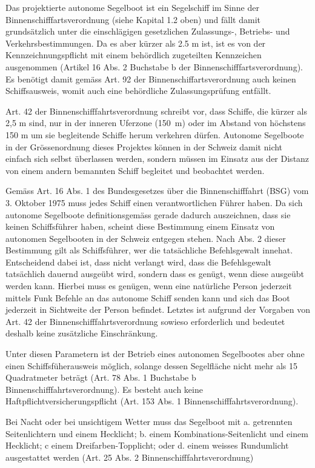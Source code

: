 Das projektierte autonome Segelboot ist ein Segelschiff im Sinne der Binnenschifffartsverordnung (siehe Kapital 1.2 oben) und fällt damit grundsätzlich unter die einschlägigen gesetzlichen Zulassungs-, Betriebs- und Verkehrsbestimmungen. Da es aber kürzer als 2.5 m ist, ist es von der Kennzeichnungspflicht mit einem behördlich zugeteilten Kennzeichen ausgenommen (Artikel 16 Abs. 2 Buchstabe b der Binnenschifffartsverordnung). Es benötigt damit gemäss Art. 92 der Binnenschiffartsverordnung auch keinen Schiffsausweis, womit auch eine behördliche Zulassungsprüfung entfällt.

Art. 42 der Binnenschifffahrtsverordnung schreibt vor, dass Schiffe, die kürzer als 2,5 m sind, nur in der inneren Uferzone (150 m) oder im Abstand von höchstens 150 m um sie begleitende Schiffe herum verkehren dürfen. Autonome Segelboote in der Grössenordnung dieses Projektes können in der Schweiz damit nicht einfach sich selbst überlassen werden, sondern müssen im Einsatz aus der Distanz von einem andern bemannten Schiff begleitet und beobachtet werden.  

Gemäss Art. 16 Abs. 1 des Bundesgesetzes über die Binnenschifffahrt (BSG) vom 3. Oktober 1975 muss jedes Schiff einen verantwortlichen Führer haben. Da sich autonome Segelboote definitionsgemäss gerade dadurch auszeichnen, dass sie keinen Schiffsführer haben, scheint diese Bestimmung einem Einsatz von autonomen Segelbooten in der Schweiz entgegen stehen. Nach Abs. 2 dieser Bestimmung gilt als Schiffsführer, wer die tatsächliche Befehlsgewalt innehat. Entscheidend dabei ist, dass nicht verlangt wird, dass die Befehlsgewalt tatsächlich dauernd ausgeübt wird, sondern dass es genügt, wenn diese ausgeübt werden kann. Hierbei muss es genügen, wenn eine natürliche Person jederzeit mittels Funk Befehle an das autonome Schiff senden kann und sich das Boot jederzeit in Sichtweite der Person befindet. Letztes ist aufgrund der Vorgaben von Art. 42 der Binnenschifffahrtsverordnung sowieso erforderlich und bedeutet deshalb keine zusätzliche Einschränkung.

Unter diesen Parametern ist der Betrieb eines autonomen Segelbootes aber ohne einen Schiffsfüherausweis möglich, solange dessen Segelfläche nicht mehr als 15 Quadratmeter beträgt (Art. 78 Abs. 1 Buchstabe b Binnenschifffahrtsverordnung). Es besteht auch keine Haftpflichtversicherungspflicht (Art. 153 Abs. 1 Binnenschifffahrtsverordnung). 

Bei Nacht oder bei unsichtigem Wetter muss das Segelboot mit a. getrennten Seitenlichtern und einem Hecklicht; b. einem Kombinations-Seitenlicht und einem Hecklicht; c einem Dreifarben-Topplicht; oder
d. einem weisses Rundumlicht ausgestattet werden (Art. 25 Abs. 2 Binnenschifffahrtsverordnung)


